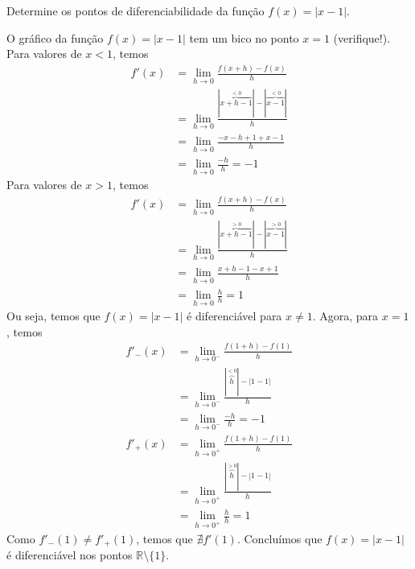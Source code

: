 \cleardoublepage\documentclass[../main.tex]{subfiles}
\begin{document}
\begin{exeresol}
  Determine os pontos de diferenciabilidade da função $f(x) = |x-1|$.
\end{exeresol}
\begin{resol}
  O gráfico da função $f(x) = |x-1|$ tem um bico no ponto $x=1$ (verifique!). Para valores de $x<1$, temos
  \begin{align*}
    f'(x) &= \lim_{h\to 0} \frac{f(x+h) - f(x)}{h}\\
          &= \lim_{h\to 0} \frac{|\overbrace{x+h-1}^{<0}| - |\overbrace{x-1}^{<0}|}{h}\\
          &= \lim_{h\to 0} \frac{-x-h+1+x-1}{h}\\
          &= \lim_{h\to 0} \frac{-h}{h} = -1
  \end{align*}
  Para valores de $x > 1$, temos
  \begin{align*}
    f'(x) &= \lim_{h\to 0} \frac{f(x+h) - f(x)}{h}\\
          &= \lim_{h\to 0} \frac{|\overbrace{x+h-1}^{>0}| - |\overbrace{x-1}^{>0}|}{h}\\
          &= \lim_{h\to 0} \frac{x+h-1-x+1}{h}\\
          &= \lim_{h\to 0} \frac{h}{h} = 1
  \end{align*}
  Ou seja, temos que $f(x) = |x-1|$ é diferenciável para $x\neq 1$. Agora, para $x=1$, temos
  \begin{align*}
    f'_{-}(x) &= \lim_{h\to 0^{-}} \frac{f(1+h) - f(1)}{h}\\
              &= \lim_{h\to 0^{-}} \frac{|\overbrace{h}^{<0}| - |1-1|}{h}\\
              &= \lim_{h\to 0^{-}} \frac{-h}{h} = -1\\
    f'_{+}(x) &= \lim_{h\to 0^{+}} \frac{f(1+h) - f(1)}{h}\\
          &= \lim_{h\to 0^{+}} \frac{|\overbrace{h}^{>0}| - |1-1|}{h}\\
              &= \lim_{h\to 0^{+}} \frac{h}{h} = 1
  \end{align*}
  Como $f'_{-}(1)\neq f'_{+}(1)$, temos que $\nexists f'(1)$. Concluímos que $f(x) = |x-1|$ é diferenciável nos pontos $\mathbb{R}\setminus\{1\}$. 
\end{resol}
\end{document}
